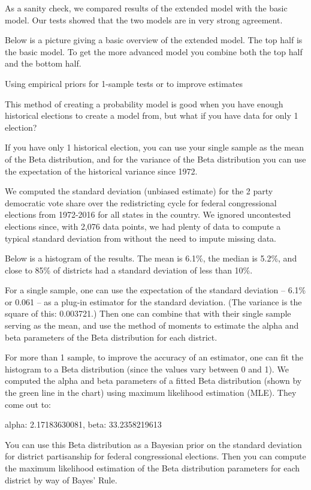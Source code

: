\documentclass[preprint,12pt]{article}
\begin{document}
As a sanity check, we compared results of the extended model with the basic model.  Our tests showed that the two models are in very strong agreement. 
 
Below is a picture giving a basic overview of the extended model.  The top half is the basic model.  To get the more advanced model you combine both the top half and the bottom half.


 

Using empirical priors for 1-sample tests or to improve estimates
 
This method of creating a probability model is good when you have enough historical elections to create a model from, but what if you have data for only 1 election?
 
If you have only 1 historical election, you can use your single sample as the mean of the Beta distribution, and for the variance of the Beta distribution you can use the expectation of the historical variance since 1972.
 
We computed the standard deviation (unbiased estimate) for the 2 party democratic vote share over the redistricting cycle for federal congressional elections from 1972-2016 for all states in the country. We ignored uncontested elections since, with 2,076 data points, we had plenty of data to compute a typical standard deviation from without the need to impute missing data.
 
Below is a histogram of the results.  The mean is 6.1\%, the median is 5.2\%, and close to 85\% of districts had a standard deviation of less than 10\%. 

 
For a single sample, one can use the expectation of the standard deviation -- 6.1\% or 0.061 -- as a plug-in estimator for the standard deviation. (The variance is the square of this: 0.003721.)  Then one can combine that with their single sample serving as the mean, and use the method of moments to estimate the alpha and beta parameters of the Beta distribution for each district.
 
For more than 1 sample, to improve the accuracy of an estimator, one can fit the histogram to a Beta distribution (since the values vary between 0 and 1).  We computed the alpha and beta parameters of a fitted Beta distribution (shown by the green line in the chart) using maximum likelihood estimation (MLE). They come out to:
 
{ alpha: 2.17183630081, beta: 33.2358219613 }
 
You can use this Beta distribution as a Bayesian prior on the standard deviation for district partisanship for federal congressional elections.  Then you can compute the maximum likelihood estimation of the Beta distribution parameters for each district by way of Bayes' Rule.  
 
\end{document}
